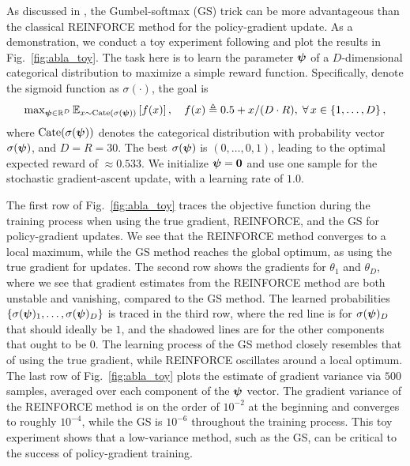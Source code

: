 As discussed in , the Gumbel-softmax (GS) trick can be more advantageous than the classical REINFORCE method \citep{reinforce1992} for the policy-gradient update.
As a demonstration, we conduct a toy experiment following \citet{arsm2019} and plot the results in Fig.~\ref{fig:abla_toy}.
The task here is to learn the parameter ${\bm{\psi}}$ of a $D$-dimensional categorical distribution to maximize a simple reward function.
Specifically, denote the sigmoid function as $\sigma(\cdot)$, the goal is
\begin{equation*}\textstyle
    \max_{{\bm{\psi}} \in \mathbb{R}^D} \mathbb{E}_{x \sim \mathrm{Cate}(\sigma({\bm{\psi}}))}\left[f(x)\right],\quad f(x) \triangleq 0.5 + x / (D \cdot R),\; \forall\, x \in \left\{1, \ldots, D\right\}, 
\end{equation*}
where $\mathrm{Cate}(\sigma({\bm{\psi}}))$ denotes the categorical distribution with probability vector $\sigma({\bm{\psi}})$, and $D=R=30$.
The best $\sigma({\bm{\psi}})$ is $(0,\ldots,0,1)$, leading to the optimal expected reward of $\approx 0.533$.
We initialize ${\bm{\psi}} = {\bm{0}}$ and use one sample for the stochastic gradient-ascent update, with a learning rate of $1.0$.

The first row of Fig.~\ref{fig:abla_toy} traces the objective function during the training process when using the true gradient, REINFORCE, and the GS for policy-gradient updates.
We see that the REINFORCE method converges to a local maximum, while the GS method reaches the global optimum, as using the true gradient for updates.
The second row shows the gradients for $\theta_1$ and $\theta_D$, where we see that gradient estimates from the REINFORCE method are both unstable and vanishing, compared to the GS method.
The learned probabilities $\left\{\sigma({\bm{\psi}})_1, \ldots, \sigma({\bm{\psi}})_D\right\}$ is traced in the third row, where the red line is for $\sigma({\bm{\psi}})_D$ that should ideally be $1$, and the shadowed lines are for the other components that ought to be $0$.
The learning process of the GS method closely resembles that of using the true gradient, while REINFORCE oscillates around a local optimum.
The last row of Fig.~\ref{fig:abla_toy} plots the estimate of gradient variance via $500$ samples, averaged over each component of the ${\bm{\psi}}$ vector.
The gradient variance of the REINFORCE method is on the order of $10^{-2}$ at the beginning and converges to roughly $10^{-4}$, while the GS is $10^{-6}$ throughout the training process.
This toy experiment shows that a low-variance method, such as the GS, can be critical to the success of policy-gradient training.





